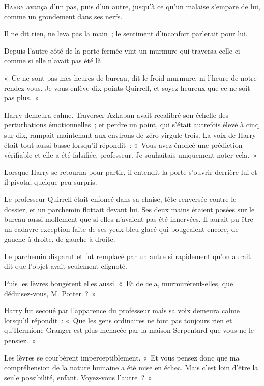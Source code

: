 
\lettrine{H}{arry} avança d'un pas, puis d'un autre, jusqu'à ce qu'un malaise s'empare de lui, comme un grondement dans ses nerfs.

Il ne dit rien, ne leva pas la main~; le sentiment d'inconfort parlerait pour lui.

Depuis l'autre côté de la porte fermée vint un murmure qui traversa celle-ci comme si elle n'avait pas été là.

«~Ce ne sont pas mes heures de bureau, dit le froid murmure, ni l'heure de notre rendez-vous.
Je vous enlève dix points Quirrell, et soyez heureux que ce ne soit pas plus.~»

Harry demeura calme.
Traverser Azkaban avait recalibré son échelle des perturbations émotionnelles~; et perdre un point, qui s'était autrefois élevé à cinq sur dix, rampait maintenant aux environs de zéro virgule trois.
La voix de Harry était tout aussi basse lorsqu'il répondit~: «~Vous avez énoncé une prédiction vérifiable et elle a été falsifiée, professeur.
Je souhaitais uniquement noter cela.~»

Lorsque Harry se retourna pour partir, il entendit la porte s'ouvrir derrière lui et il pivota, quelque peu surpris.

Le professeur Quirrell était enfoncé dans sa chaise, tête renversée contre le dossier, et un parchemin flottait devant lui.
Ses deux mains étaient posées sur le bureau aussi mollement que si elles n'avaient pas été innervées.
Il aurait pu être un cadavre exception faite de ses yeux bleu glacé qui bougeaient encore, de gauche à droite, de gauche à droite.

Le parchemin disparut et fut remplacé par un autre si rapidement qu'on aurait dit que l'objet avait seulement clignoté.

Puis les lèvres bougèrent elles aussi.
«~Et de cela, murmurèrent-elles, que déduisez-vous, M. Potter~?~»

Harry fut secoué par l'apparence du professeur mais sa voix demeura calme lorsqu'il répondit~: «~Que les gens ordinaires ne font pas toujours rien et qu'Hermione Granger est plus menacée par la maison Serpentard que vous ne le pensiez.~»

Les lèvres se courbèrent imperceptiblement.
«~Et vous pensez donc que ma compréhension de la nature humaine a été mise en échec.
Mais c'est loin d'être la seule possibilité, enfant.
Voyez-vous l'autre~?~»

